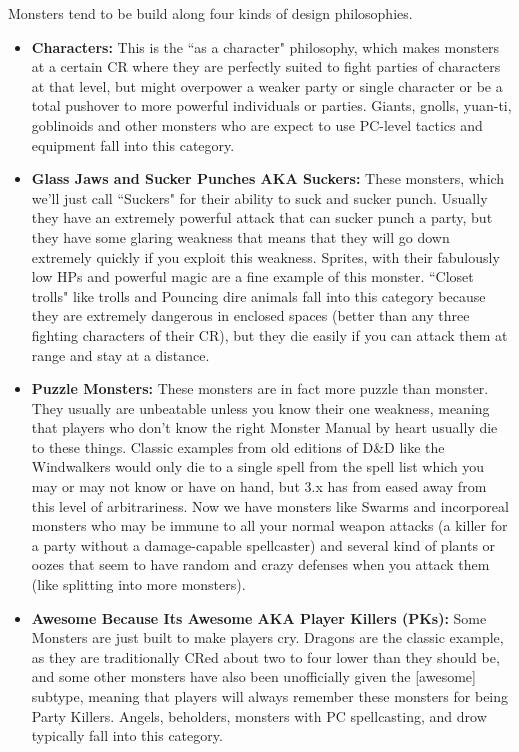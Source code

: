 Monsters tend to be build along four kinds of design philosophies.

\begin{itemize}\itemspace
   \item \textbf{Characters:} This is the ``as a character" philosophy, which makes monsters at a certain CR where they are perfectly suited to fight parties of characters at that level, but might overpower a weaker party or single character or be a total pushover to more powerful individuals or parties. Giants, gnolls, yuan-ti, goblinoids and other monsters who are expect to use PC-level tactics and equipment fall into this category.
   \item \textbf{Glass Jaws and Sucker Punches AKA Suckers:} These monsters, which we'll just call ``Suckers" for their ability to suck and sucker punch. Usually they have an extremely powerful attack that can sucker punch a party, but they have some glaring weakness that means that they will go down extremely quickly if you exploit this weakness. Sprites, with their fabulously low HPs and powerful magic are a fine example of this monster. ``Closet trolls" like trolls and Pouncing dire animals fall into this category because they are extremely dangerous in enclosed spaces (better than any three fighting characters of their CR), but they die easily if you can attack them at range and stay at a distance.
   \item \textbf{Puzzle Monsters:} These monsters are in fact more puzzle than monster. They usually are unbeatable unless you know their one weakness, meaning that players who don't know the right Monster Manual by heart usually die to these things. Classic examples from old editions of D\&D like the Windwalkers would only die to a single spell from the spell list which you may or may not know or have on hand, but 3.x has from eased away from this level of arbitrariness. Now we have monsters like Swarms and incorporeal monsters who may be immune to all your normal weapon attacks (a killer for a party without a damage-capable spellcaster) and several kind of plants or oozes that seem to have random and crazy defenses when you attack them (like splitting into more monsters).
   \item \textbf{Awesome Because Its Awesome AKA Player Killers (PKs):} Some Monsters are just built to make players cry. Dragons are the classic example, as they are traditionally CRed about two to four lower than they should be, and some other monsters have also been unofficially given the [awesome] subtype, meaning that players will always remember these monsters for being Party Killers. Angels, beholders, monsters with PC spellcasting, and drow typically fall into this category.
\end{itemize}


